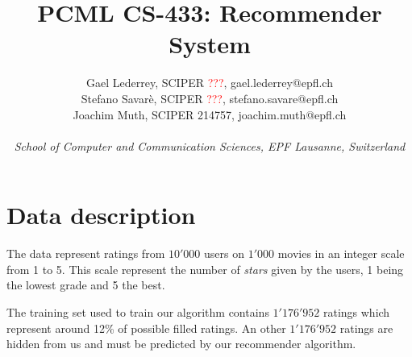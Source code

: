 \documentclass[10pt,conference,compsocconf]{IEEEtran}
\begin{document}
\title{PCML CS-433: Recommender System}

\author{
  Gael Lederrey, SCIPER \textcolor{red}{???}, gael.lederrey@epfl.ch \\
  Stefano Savar\`e, SCIPER \textcolor{red}{???}, stefano.savare@epfl.ch \\
  Joachim Muth, SCIPER 214757, joachim.muth@epfl.ch\\ \\
  \textit{School of Computer and Communication Sciences, EPF Lausanne, Switzerland}
}

\maketitle

\begin{abstract}

\end{abstract}

\section{Data description}

The data represent ratings from $10'000$ users on $1'000$ movies in an integer scale from 1 to 5. This scale represent the number of \textit{stars} given by the users, 1 being the lowest grade and 5 the best.

The training set used to train our algorithm contains $1'176'952$ ratings which represent around 12\% of possible filled ratings. 
An other $1'176'952$ ratings are hidden from us and must be predicted by our recommender algorithm.


\end{document}
